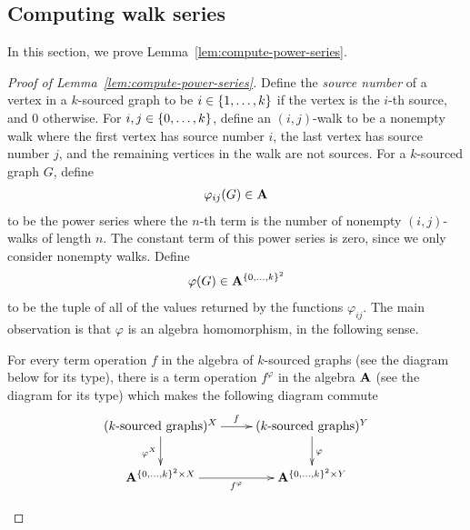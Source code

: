 \subsection{Computing walk series}
In this section, we prove Lemma~\ref{lem:compute-power-series}.
\lemcomputePowerSeries*
\begin{proof}[Proof of Lemma~\ref{lem:compute-power-series}]
	
	
	Define the \emph{source number} of a vertex in a $k$-sourced graph to be  $i \in \{1,\ldots,k\}$ if the vertex is the $i$-th source, and $0$ otherwise. For
	$i,j \in \{0,\ldots,k\}$,
	define an $(i,j)$-walk to be a nonempty walk where the first vertex has source number $i$, the last vertex has source number $j$, and the remaining vertices in the walk are not sources. For a $k$-sourced graph $G$, define 
	\begin{align*}
	\varphi_{ij}(G) \in \mathbf{A}
	\end{align*}
	to be the power series where the $n$-th term is the number of nonempty $(i,j)$-walks of length $n$. The constant term  of this power series is zero, since we only consider nonempty walks. Define 
	\begin{align*}
	\varphi(G) \in \mathbf{A}^{\{0,\ldots,k\}^2}
	\end{align*}
	to be the tuple of all of the values returned by the functions $\varphi_{ij}$. 
	The main observation is that $\varphi$ is an algebra homomorphism, in the following sense.
	\begin{claim}
		For every term operation $f$ 
		in the algebra of $k$-sourced graphs (see the diagram below for its type), there is a term operation $f^\varphi$ in the algebra $\mathbf{A}$ (see the diagram for its type) which makes the following diagram commute
		\begin{align*}
		\xymatrix{
			(\text{$k$-sourced graphs})^X 
			\ar[r]^f
			\ar[d]_{\varphi^X}
			&
			(\text{$k$-sourced graphs})^Y
			\ar[d]^\varphi
			\\
			\aalg^{\set{0,\ldots,k}^2 \times X}
			\ar[r]_{f^\varphi}
			&
			\aalg^{\set{0,\ldots,k}^2 \times Y}
		}
		\end{align*}

\end{claim}
\end{proof}
